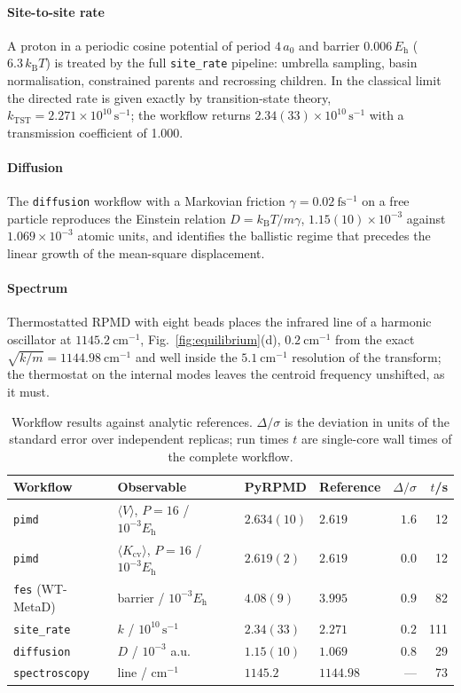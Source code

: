 \documentclass[preprint,12pt]{elsarticle}
\newcommand{\code}[1]{\texttt{#1}}
\newcommand{\kB}{k_{\mathrm{B}}}
\newcommand{\Eh}{E_{\mathrm{h}}}
\begin{document}
\paragraph{Site-to-site rate} A proton in a periodic cosine potential of period $4\,a_0$ and barrier $0.006\,\Eh$ ($6.3\,\kB T$) is treated by the full \code{site\_rate} pipeline: umbrella sampling, basin normalisation, constrained parents and recrossing children. In the classical limit the directed rate is given exactly by transition-state theory, $k_{\mathrm{TST}}=2.271\times10^{10}\,\mathrm s^{-1}$; the workflow returns $2.34(33)\times10^{10}\,\mathrm s^{-1}$ with a transmission coefficient of 1.000.

\paragraph{Diffusion} The \code{diffusion} workflow with a Markovian friction $\gamma=0.02~\mathrm{fs^{-1}}$ on a free particle reproduces the Einstein relation $D=\kB T/m\gamma$, $1.15(10)\times10^{-3}$ against $1.069\times10^{-3}$ atomic units, and identifies the ballistic regime that precedes the linear growth of the mean-square displacement.

\paragraph{Spectrum} Thermostatted RPMD with eight beads places the infrared line of a harmonic oscillator at $1145.2~\mathrm{cm^{-1}}$, Fig.~\ref{fig:equilibrium}(d), $0.2~\mathrm{cm^{-1}}$ from the exact $\sqrt{k/m}=1144.98~\mathrm{cm^{-1}}$ and well inside the $5.1~\mathrm{cm^{-1}}$ resolution of the transform; the thermostat on the internal modes leaves the centroid frequency unshifted, as it must.

\begin{table}[!htbp]
\caption{Workflow results against analytic references. $\Delta/\sigma$ is the deviation in units of the standard error over independent replicas; run times $t$ are single-core wall times of the complete workflow.}
\label{tab:tutorials}
\small
\setlength{\tabcolsep}{3pt}\begin{tabular*}{\textwidth}{@{\extracolsep{\fill}}llllrr@{}}
\toprule
Workflow & Observable & PyRPMD & Reference & $\Delta/\sigma$ & $t$/s \\
\midrule
\code{pimd} & $\langle V\rangle$, $P=16$ / $10^{-3}\Eh$ & $2.634(10)$ & $2.619$ & $1.6$ & 12 \\
\code{pimd} & $\langle K_{\mathrm{cv}}\rangle$, $P=16$ / $10^{-3}\Eh$ & $2.619(2)$ & $2.619$ & $0.0$ & 12 \\
\code{fes} (WT-MetaD) & barrier / $10^{-3}\Eh$ & $4.08(9)$ & $3.995$ & $0.9$ & 82 \\
\code{site\_rate} & $k$ / $10^{10}\,\mathrm s^{-1}$ & $2.34(33)$ & $2.271$ & $0.2$ & 111 \\
\code{diffusion} & $D$ / $10^{-3}$ a.u. & $1.15(10)$ & $1.069$ & $0.8$ & 29 \\
\code{spectroscopy} & line / $\mathrm{cm^{-1}}$ & $1145.2$ & $1144.98$ & --- & 73 \\
\bottomrule
\end{tabular*}
\end{table}
\end{document}
